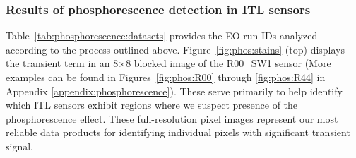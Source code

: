 \subsubsection{Results of phosphorescence detection in ITL sensors}\label{phos-results}

Table~\ref{tab:phosphorescence:datasets} provides the EO run IDs analyzed according to the process outlined above. Figure~\ref{fig:phos:stains} (top) displays the transient term in an 8$\times$8 blocked image of the R00\_SW1 sensor (More examples can be found in Figures~\ref{fig:phos:R00} through \ref{fig:phos:R44} in Appendix \ref{appendix:phosphorescence}). These serve primarily to help identify which ITL sensors exhibit regions where we suspect presence of the phosphorescence effect. These full-resolution pixel images represent our most reliable data products for identifying individual pixels with significant transient signal. 

